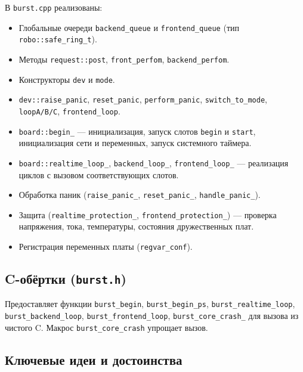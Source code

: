 \documentclass[a4paper,12pt]{article}
\begin{document}
В \texttt{burst.cpp} реализованы:

\begin{itemize}
    \item Глобальные очереди \texttt{backend\_queue} и \texttt{frontend\_queue} (тип \texttt{robo::safe\_ring\_t}).
    \item Методы \texttt{request::post}, \texttt{front\_perfom}, \texttt{backend\_perfom}.
    \item Конструкторы \texttt{dev} и \texttt{mode}.
    \item \texttt{dev::raise\_panic}, \texttt{reset\_panic}, \texttt{perform\_panic}, \texttt{switch\_to\_mode}, \texttt{loopA/B/C}, \texttt{frontend\_loop}.
    \item \texttt{board::begin\_} — инициализация, запуск слотов \texttt{begin} и \texttt{start}, инициализация сети и переменных, запуск системного таймера.
    \item \texttt{board::realtime\_loop\_}, \texttt{backend\_loop\_}, \texttt{frontend\_loop\_} — реализация циклов с вызовом соответствующих слотов.
    \item Обработка паник (\texttt{raise\_panic\_}, \texttt{reset\_panic\_}, \texttt{handle\_panic\_}).
    \item Защита (\texttt{realtime\_protection\_}, \texttt{frontend\_protection\_}) — проверка напряжения, тока, температуры, состояния дружественных плат.
    \item Регистрация переменных платы (\texttt{regvar\_conf}).
\end{itemize}

\subsection{C-обёртки (\texttt{burst.h})}

Предоставляет функции \texttt{burst\_begin}, \texttt{burst\_begin\_ps}, \texttt{burst\_realtime\_loop}, \texttt{burst\_backend\_loop}, \texttt{burst\_frontend\_loop}, \texttt{burst\_core\_crash\_} для вызова из чистого C. Макрос \texttt{burst\_core\_crash} упрощает вызов.

\subsection{Ключевые идеи и достоинства}
\end{document}
